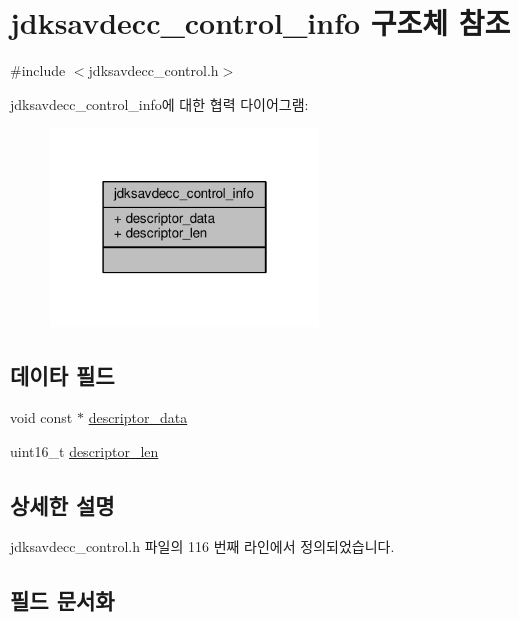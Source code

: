 \hypertarget{structjdksavdecc__control__info}{}\section{jdksavdecc\+\_\+control\+\_\+info 구조체 참조}
\label{structjdksavdecc__control__info}


{\ttfamily \#include $<$jdksavdecc\+\_\+control.\+h$>$}



jdksavdecc\+\_\+control\+\_\+info에 대한 협력 다이어그램\+:
\nopagebreak
\begin{figure}[H]
\begin{center}
\leavevmode
\includegraphics[width=202pt]{structjdksavdecc__control__info__coll__graph}
\end{center}
\end{figure}
\subsection*{데이타 필드}
\begin{DoxyCompactItemize}
\item 
void const $\ast$ \hyperlink{structjdksavdecc__control__info_a79927c7901f9ba81476dc0b6a98810dc}{descriptor\+\_\+data}
\item 
uint16\+\_\+t \hyperlink{structjdksavdecc__control__info_af8f69a47554e1b5762d3fe71d4e5926a}{descriptor\+\_\+len}
\end{DoxyCompactItemize}


\subsection{상세한 설명}


jdksavdecc\+\_\+control.\+h 파일의 116 번째 라인에서 정의되었습니다.



\subsection{필드 문서화}
